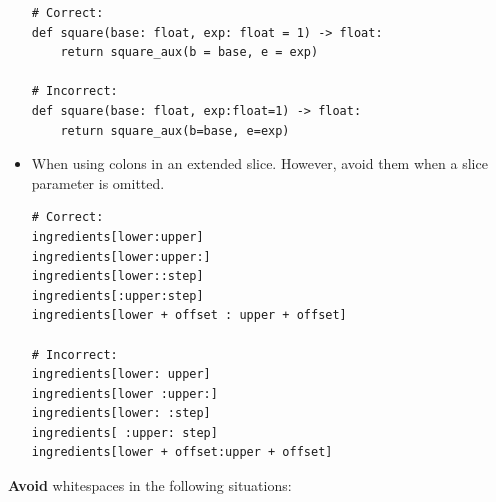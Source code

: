 \documentclass{tufte-handout}
\begin{document}
\begin{itemize}
\begin{mdframed}
\begin{verbatim}
# Correct:
def square(base: float, exp: float = 1) -> float:
    return square_aux(b = base, e = exp)
			
# Incorrect:
def square(base: float, exp:float=1) -> float:
    return square_aux(b=base, e=exp)
\end{verbatim}
\end{mdframed}

	\item When using colons in an extended slice. However, avoid them when a slice parameter is omitted.
	
\begin{mdframed}
\begin{verbatim}
# Correct:
ingredients[lower:upper]
ingredients[lower:upper:]
ingredients[lower::step]
ingredients[:upper:step]
ingredients[lower + offset : upper + offset]

# Incorrect:
ingredients[lower: upper]
ingredients[lower :upper:]
ingredients[lower: :step]
ingredients[ :upper: step]
ingredients[lower + offset:upper + offset]
\end{verbatim}
\end{mdframed}
	
\end{itemize}
\textbf{Avoid} whitespaces in the following situations:
\end{document}
